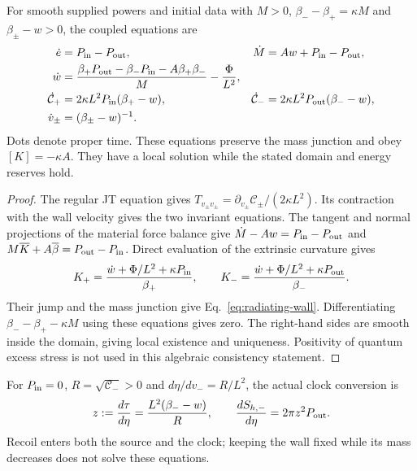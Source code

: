 \begin{proposition}
\label{prop:radiating-junction}
For smooth supplied powers and initial data with $M>0$,
$\beta_--\beta_+=\kappa M$ and $\beta_\pm-w>0$, the coupled equations are
\begin{align}
 \dot e&=P_{\rm in}-P_{\rm out},&
 \dot M&=Aw+P_{\rm in}-P_{\rm out},\nonumber\\
 \dot w&=\frac{\beta_+P_{\rm out}-\beta_-P_{\rm in}
                         -A\beta_+\beta_-}{M}-\frac\Phi{L^2},
                     \label{eq:radiating-wall}\\
 \dot{\mathcal C}_+&=2\kappa L^2P_{\rm in}(\beta_+-w),&
 \dot{\mathcal C}_-&=2\kappa L^2P_{\rm out}(\beta_--w),\nonumber\\
 \dot v_\pm&=(\beta_\pm-w)^{-1}.&&\nonumber
\end{align}
Dots denote proper time. These equations preserve the mass junction and
obey $[K]=-\kappa A$. They have a local solution while the stated domain
and energy reserves hold.
\end{proposition}
\begin{proof}
The regular JT equation gives
$T_{v_\pm v_\pm}=\partial_{v_\pm}\mathcal C_\pm/(2\kappa L^2)$.
Its contraction with the wall velocity gives the two invariant equations.
The tangent and normal projections of the material force balance give
$\dot M-Aw=P_{\rm in}-P_{\rm out}$ and
$M\overline K+A\overline\beta=P_{\rm out}-P_{\rm in}$.
Direct evaluation of the extrinsic curvature gives
\[
 K_+=\frac{\dot w+\Phi/L^2+\kappa P_{\rm in}}{\beta_+},\qquad
 K_-=\frac{\dot w+\Phi/L^2+\kappa P_{\rm out}}{\beta_-}.
\]
Their jump and the mass junction give Eq.~\eqref{eq:radiating-wall}.
Differentiating $\beta_--\beta_+-\kappa M$ using these equations gives
zero. The right-hand sides are smooth inside the domain, giving local
existence and uniqueness. Positivity of quantum excess stress is not used
in this algebraic consistency statement.
\end{proof}

For $P_{\rm in}=0$, $R=\sqrt{\mathcal C_-}>0$ and
$d\eta/dv_-=R/L^2$, the actual clock conversion is
\begin{equation}\label{eq:material-clock-conversion}
 z:=\frac{d\tau}{d\eta}=\frac{L^2(\beta_--w)}R,\qquad
 \frac{dS_{h,-}}{d\eta}=2\pi z^2P_{\rm out}.
\end{equation}
Recoil enters both the source and the clock; keeping the wall fixed while
its mass decreases does not solve these equations.


